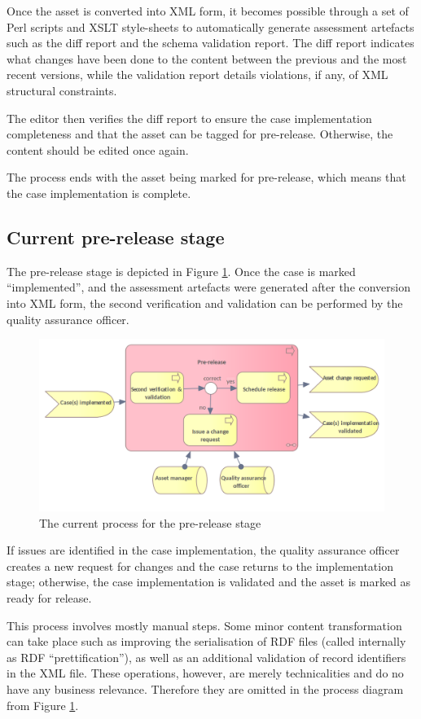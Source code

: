 	Once the asset is converted into XML form, it becomes possible through a set of Perl scripts and XSLT style-sheets \citep{xslt3-Kay} to automatically generate assessment artefacts such as the diff report and the schema validation report. The diff report indicates what changes have been done to the content between the previous and the most recent versions, while the validation report details violations, if any, of XML structural constraints.
	
	The editor then verifies the diff report to ensure the case implementation completeness and that the asset can be tagged for pre-release. Otherwise, the content should be edited once again. 
	
	The process ends with the asset being marked for pre-release, which means that the case implementation is complete.
	
	\subsection{Current pre-release stage}
	\label{sec:pre-release-current}	

	The pre-release stage is depicted in Figure \ref{fig:pre-release-current}. Once the case is marked ``implemented'', and the assessment artefacts were generated after the conversion into XML form, the second verification and validation can be performed by the quality assurance officer. 
	
	\begin{figure}[h]
		\centering
		\includegraphics[width=.65\textwidth]{images/business/current/Pre-release.png}
		\caption{The current process for the pre-release stage}
		\label{fig:pre-release-current}
	\end{figure}

	If issues are identified in the case implementation, the quality assurance officer creates a new request for changes and the case returns to the implementation stage; otherwise, the case implementation is validated and the asset is marked as ready for release. 
	
	This process involves mostly manual steps. Some minor content transformation can take place such as improving the serialisation of RDF files (called internally as RDF ``prettification''), as well as an additional validation of record identifiers in the XML file. These operations, however, are merely technicalities and do no have any business relevance. Therefore they are omitted in the process diagram from Figure \ref{fig:pre-release-current}. 

